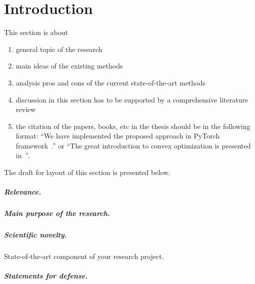 \chapter{Introduction}

This section is about
\begin{enumerate}
    \item general topic of the research
    \item main ideas of the existing methods
    \item analysis pros and cons of the current state-of-the-art methods
    \item discussion in this section has to be supported by a comprehensive literature review  
    \item the citation of the papers, books, etc in the thesis should be in the following format: ``We have implemented the proposed approach in PyTorch framework~\cite{paszke2019pytorch}.'' or ``The great introduction to convex optimization is presented in~\cite{boyd2004convex}''.
\end{enumerate}

The draft for layout of this section is presented below.

\paragraph{Relevance.}

\paragraph{Main purpose of the research.}

\paragraph{Scientific novelty.}
State-of-the-art component of your research project.




\paragraph{Statements for defense.}